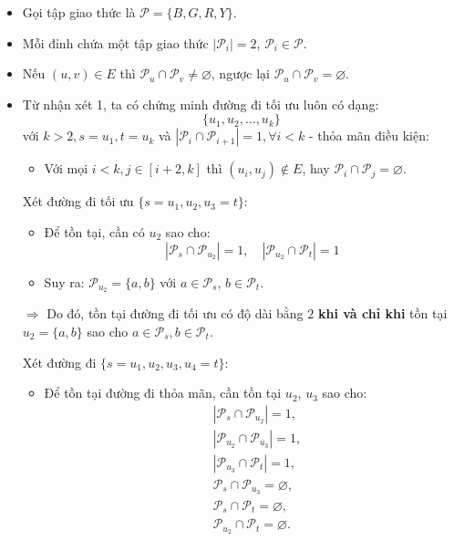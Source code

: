 \documentclass[12pt,a4paper]{article}
\begin{document}
	\begin{itemize}
	
	\item Gọi tập giao thức là $\mathcal{P} = \{B, G, R, Y\}$.  
	\item Mỗi đỉnh chứa một tập giao thức $|\mathcal{P}_i| = 2$, $\mathcal{P}_i \in \mathcal{P}$.  
	\item Nếu $(u, v) \in E$ thì $\mathcal{P}_u \cap \mathcal{P}_v \ne \varnothing$, ngược lại $\mathcal{P}_u \cap \mathcal{P}_v = \varnothing$.
	
	\item Từ nhận xét 1, ta có chứng minh đường đi tối ưu luôn có dạng:
	\[
	\{ u_1, u_2, \ldots, u_k \}
	\]
	với $k > 2, s = u_1, t = u_k$ và $|\mathcal{P}_i \cap \mathcal{P}_{i+1}| = 1, \forall i < k$ - thỏa mãn điều kiện:
	\begin{itemize}
		\item Với mọi $i < k, j \in [i + 2, k]$ thì $(u_i, u_j) \notin E$, hay $\mathcal{P}_i \cap \mathcal{P}_j = \varnothing$.
	\end{itemize}
	
	Xét đường đi tối ưu $\{s = u_1, u_2, u_3 = t\}$:  
	\begin{itemize}
		\item Để tồn tại, cần có $u_2$ sao cho:
	\[
	|\mathcal{P}_s \cap \mathcal{P}_{u_2}| = 1, \quad |\mathcal{P}_{u_2} \cap \mathcal{P}_t| = 1
	\]
	\item Suy ra: $\mathcal{P}_{u_2} = \{a, b\}$ với $a \in \mathcal{P}_s$, $b \in \mathcal{P}_t$.
	\end{itemize}

	$\Rightarrow$ Do đó, tồn tại đường đi tối ưu có độ dài bằng $2$ \textbf{khi và chỉ khi} tồn tại $u_2 = \{a, b\}$ sao cho $a \in \mathcal{P}_s, b \in \mathcal{P}_t$. 
	
	Xét đường đi $\{s = u_1, u_2, u_3, u_4 = t\}$:
	\begin{itemize}
		\item Để tồn tại đường đi thỏa mãn, cần tồn tại $u_2$, $u_3$ sao cho:
		\begin{align*}
			&|\mathcal{P}_s \cap \mathcal{P}_{u_2}| = 1, \\
			&|\mathcal{P}_{u_2} \cap \mathcal{P}_{u_3}| = 1, \\
			&|\mathcal{P}_{u_3} \cap \mathcal{P}_{t}| = 1, \\
			&\mathcal{P}_{s} \cap \mathcal{P}_{u_3} = \varnothing, \\
			&\mathcal{P}_{s} \cap \mathcal{P}_{t} = \varnothing, \\
			&\mathcal{P}_{u_2} \cap \mathcal{P}_{t} = \varnothing.
		\end{align*}
		

\end{itemize}
\end{itemize}
\end{document}
